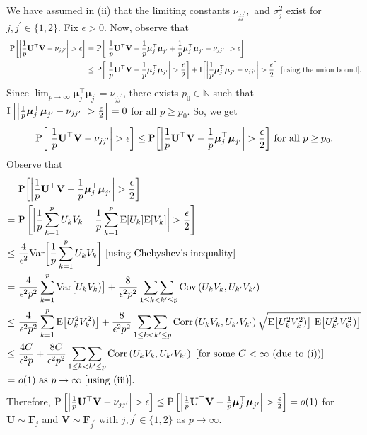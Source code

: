 \documentclass[twoside]{article}
\newcommand{\bF}{\mathbf{F}}
\newcommand{\bU}{\mathbf{U}}
\newcommand{\bV}{\mathbf{V}}
\newcommand{\bmu}{\boldsymbol{\mu}}
\newcommand{\0}{\mathbf{0}}
\newcommand{\1}{\mathbf{1}}
\numberwithin{equation}{section}
\begin{document}
We have assumed in (ii) that the limiting constants $\nu_{jj^\prime},$ and $\sigma^2_j$ exist for $j,j^\prime\in\{1,2\}.$ Fix $\epsilon>0$. Now, observe that
\begin{align*}
\ {\rm P}\bigg [\bigg |\frac{1}{p}\bU^\top\bV - \nu_{jj^\prime}\bigg |>\epsilon\bigg ]
=&\ {\rm P}\bigg [\bigg |\frac{1}{p}\bU^\top\bV - \frac{1}{p}\bmu_j^\top\bmu_{j^\prime} + \frac{1}{p}\bmu_j^\top\bmu_{j^\prime} - \nu_{jj^\prime}\bigg |>\epsilon\bigg ]\\
\leq &\ {\rm P}\bigg [\bigg |\frac{1}{p}\bU^\top\bV - \frac{1}{p}\bmu_j^\top\bmu_{j^\prime}\bigg |>\frac{\epsilon}{2}\bigg ] + {\rm I}\bigg [\bigg |\frac{1}{p}\bmu_j^\top\bmu_{j^\prime} - \nu_{jj^\prime}\bigg |>\frac{\epsilon}{2}\bigg ]\ [\text{using the union bound}].
\end{align*}
Since $\lim_{p\to\infty}\bmu_j^\top\bmu_{j^\prime}=\nu_{jj^\prime}$, there exists $p_0\in\mathbb{N}$ such that ${\rm I}\left [\left |\frac{1}{p}\bmu_j^\top\bmu_{j^\prime} - \nu_{jj^\prime}\right |>\frac{\epsilon}{2}\right ]=0$ for all $p\geq p_0$. So, we get $${\rm P}\bigg [\bigg |\frac{1}{p}\bU^\top\bV - \nu_{jj^\prime}\bigg |>\epsilon\bigg ]\leq {\rm P}\bigg [\bigg |\frac{1}{p}\bU^\top\bV - \frac{1}{p}\bmu_j^\top\bmu_{j^\prime}\bigg |>\frac{\epsilon}{2}\bigg ]\text{ for all }p\ge p_0.$$
Observe that
\begin{align}\label{ref1}
&\ {\rm P}\bigg [\bigg |\frac{1}{p}\bU^\top\bV - \frac{1}{p}\bmu_j^\top\bmu_{j^\prime}\bigg |>\frac{\epsilon}{2}\bigg ]\\
= &\ {\rm P}\left [\bigg |\frac{1}{p}\sum_{k=1}^p U_{k}V_k - \frac{1}{p}\sum_{k=1}^p {\rm E}[ U_{k}]{\rm E}[V_k]\bigg |>\frac{\epsilon}{2}\right]\nonumber\\
\leq &\ \frac{4}{\epsilon^2}{\rm Var}\bigg [\frac{1}{p}\sum_{k=1}^p U_{k}V_{k}\bigg ]\ [\text{using Chebyshev's inequality}]\nonumber \\
=&\ \frac{4}{\epsilon^2 p^2}\sum_{k=1}^p {\rm Var}\big [U_{k}V_{k})\big ]
 +\frac{8}{\epsilon^2 p^2}\mathop{\sum\sum}_{1\leq k< k^\prime\leq p} {\rm Cov}\left(U_{k}V_{k},U_{k^\prime}V_{k^\prime}\right)\nonumber \\
\leq &\ \frac{4}{\epsilon^2 p^2}\sum_{k=1}^p {\rm E}\big [U^2_{k}V^2_{k})\big ]
 +\frac{8}{\epsilon^2 p^2}\mathop{\sum\sum}_{1\leq k< k^\prime\leq p} {\rm Corr}\left(U_{k}V_{k},U_{k^\prime}V_{k^\prime}\right)\sqrt{{\rm E}\big [U^2_{k}V^2_{k})\big ]\ {\rm E}\big [U^2_{k^\prime}V^2_{k^\prime})\big ]}\nonumber \\
 \leq &\ \frac{4C}{\epsilon^2 p}
 +\frac{8C}{\epsilon^2 p^2}\mathop{\sum\sum}_{1\leq k< k^\prime\leq p} {\rm Corr}\left(U_{k}V_{k},U_{k^\prime}V_{k^\prime}\right)\ [\text{for some }C<\infty\ (\text{due to (i)})]\nonumber \\
 =&\ o(1)\text{ as }p\to\infty\ [\text{using (iii)}].
\end{align}
Therefore, ${\rm P}\left [\left |\frac{1}{p}\bU^\top\bV - \nu_{jj^\prime}\right |>\epsilon\right ]\leq {\rm P}\left [\left |\frac{1}{p}\bU^\top\bV - \frac{1}{p}\bmu_j^\top\bmu_{j^\prime}\right |>\frac{\epsilon}{2}\right ] =o(1)$ for $\bU\sim\bF_j$ and $\bV\sim\bF_{j^\prime}$ with $j,j^\prime\in\{1,2\}$ as $p\to\infty$.
\end{document}
